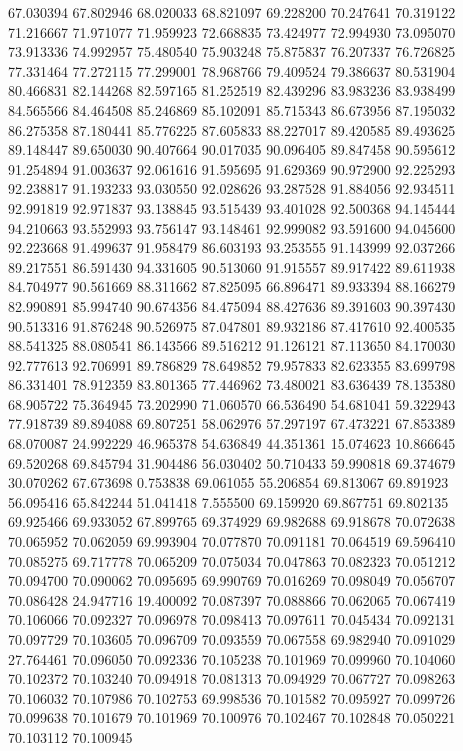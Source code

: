 67.030394
67.802946
68.020033
68.821097
69.228200
70.247641
70.319122
71.216667
71.971077
71.959923
72.668835
73.424977
72.994930
73.095070
73.913336
74.992957
75.480540
75.903248
75.875837
76.207337
76.726825
77.331464
77.272115
77.299001
78.968766
79.409524
79.386637
80.531904
80.466831
82.144268
82.597165
81.252519
82.439296
83.983236
83.938499
84.565566
84.464508
85.246869
85.102091
85.715343
86.673956
87.195032
86.275358
87.180441
85.776225
87.605833
88.227017
89.420585
89.493625
89.148447
89.650030
90.407664
90.017035
90.096405
89.847458
90.595612
91.254894
91.003637
92.061616
91.595695
91.629369
90.972900
92.225293
92.238817
91.193233
93.030550
92.028626
93.287528
91.884056
92.934511
92.991819
92.971837
93.138845
93.515439
93.401028
92.500368
94.145444
94.210663
93.552993
93.756147
93.148461
92.999082
93.591600
94.045600
92.223668
91.499637
91.958479
86.603193
93.253555
91.143999
92.037266
89.217551
86.591430
94.331605
90.513060
91.915557
89.917422
89.611938
84.704977
90.561669
88.311662
87.825095
66.896471
89.933394
88.166279
82.990891
85.994740
90.674356
84.475094
88.427636
89.391603
90.397430
90.513316
91.876248
90.526975
87.047801
89.932186
87.417610
92.400535
88.541325
88.080541
86.143566
89.516212
91.126121
87.113650
84.170030
92.777613
92.706991
89.786829
78.649852
79.957833
82.623355
83.699798
86.331401
78.912359
83.801365
77.446962
73.480021
83.636439
78.135380
68.905722
75.364945
73.202990
71.060570
66.536490
54.681041
59.322943
77.918739
89.894088
69.807251
58.062976
57.297197
67.473221
67.853389
68.070087
24.992229
46.965378
54.636849
44.351361
15.074623
10.866645
69.520268
69.845794
31.904486
56.030402
50.710433
59.990818
69.374679
30.070262
67.673698
0.753838
69.061055
55.206854
69.813067
69.891923
56.095416
65.842244
51.041418
7.555500
69.159920
69.867751
69.802135
69.925466
69.933052
67.899765
69.374929
69.982688
69.918678
70.072638
70.065952
70.062059
69.993904
70.077870
70.091181
70.064519
69.596410
70.085275
69.717778
70.065209
70.075034
70.047863
70.082323
70.051212
70.094700
70.090062
70.095695
69.990769
70.016269
70.098049
70.056707
70.086428
24.947716
19.400092
70.087397
70.088866
70.062065
70.067419
70.106066
70.092327
70.096978
70.098413
70.097611
70.045434
70.092131
70.097729
70.103605
70.096709
70.093559
70.067558
69.982940
70.091029
27.764461
70.096050
70.092336
70.105238
70.101969
70.099960
70.104060
70.102372
70.103240
70.094918
70.081313
70.094929
70.067727
70.098263
70.106032
70.107986
70.102753
69.998536
70.101582
70.095927
70.099726
70.099638
70.101679
70.101969
70.100976
70.102467
70.102848
70.050221
70.103112
70.100945
